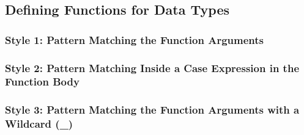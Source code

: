 \hypertarget{defining-functions-for-data-types}{%
\subsection{Defining Functions for Data
Types}\label{defining-functions-for-data-types}}

\hypertarget{style-1-pattern-matching-the-function-arguments}{%
\subsubsection{Style 1: Pattern Matching the Function
Arguments}\label{style-1-pattern-matching-the-function-arguments}}

\begin{Shaded}
\begin{Highlighting}[]
  \OtherTok{{-}\textgreater{}} 

      \OtherTok{=} 
  \OtherTok{=} 
  \OtherTok{=} 
\end{Highlighting}
\end{Shaded}

\hypertarget{style-2-pattern-matching-inside-a-case-expression-in-the-function-body}{%
\subsubsection{Style 2: Pattern Matching Inside a Case Expression in the
Function
Body}\label{style-2-pattern-matching-inside-a-case-expression-in-the-function-body}}

\begin{Shaded}
\begin{Highlighting}[]
  \OtherTok{{-}\textgreater{}} 

\OtherTok{=} 
         \OtherTok{{-}\textgreater{}} 
     \OtherTok{{-}\textgreater{}} 
     \OtherTok{{-}\textgreater{}} 
\end{Highlighting}
\end{Shaded}

\hypertarget{style-3-pattern-matching-the-function-arguments-with-a-wildcard-_}{%
\subsubsection{Style 3: Pattern Matching the Function Arguments with a
Wildcard
(\_)}\label{style-3-pattern-matching-the-function-arguments-with-a-wildcard-_}}

